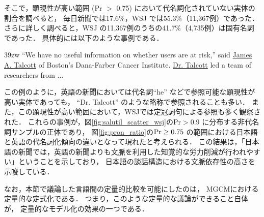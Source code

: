 \documentclass[japanese]{jnlp_1.3e}
\begin{document}
そこで，顕現性が高い範囲 (Pr $>$ 0.75) において代名詞化されていない実体の割合を調べると，
毎日新聞では17.6\%，WSJ では55.3\%（11,367例）であった．
さらに詳しく調べると，WSJ の11,367例のうちの41.7\%（4,735例）は固有名詞であった．
具体的には以下のような事例である．

    \vspace{\baselineskip}\begin{fminipage}{39zw}
\noindent
``We have no useful information on whether users are at risk,'' said \underline{James A. Talcott} of Boston's Dana-Farber Cancer Institute. \underline{Dr. Talcott} led a team of researchers from ...
    \end{fminipage}\vspace{\baselineskip}


この例のように，英語の新聞においては代名詞``he'' などで参照可能な顕現性が高い実体であっても，
``Dr. Talcott'' のような略称で参照されることも多い．
また，この顕現性が高い範囲において，WSJでは定冠詞句による参照も多く観察された．
これらの事例が，図\ref{fig:salutil_scatter_wsj}のPr$>$0.9 に分布する非代名詞サンプルの正体であり，
図\ref{fig:pron_ratio}の${\rm Pr}\ge 0.75$ の範囲における日本語と英語の代名詞化傾向の違いとなって現れたと考えられる．
この結果は，「日本語の新聞では，英語の新聞よりも文脈を利用した知覚的な労力削減が行われやすい」ということを示しており，
日本語の談話構造における文脈依存性の高さを示唆している．

なお，本節で議論した言語間の定量的比較を可能にしたのは，
MGCMにおける定量的な定式化である．
つまり，このような定量的な議論ができること自体が，
定量的なモデル化の効果の一つである．
\end{document}

